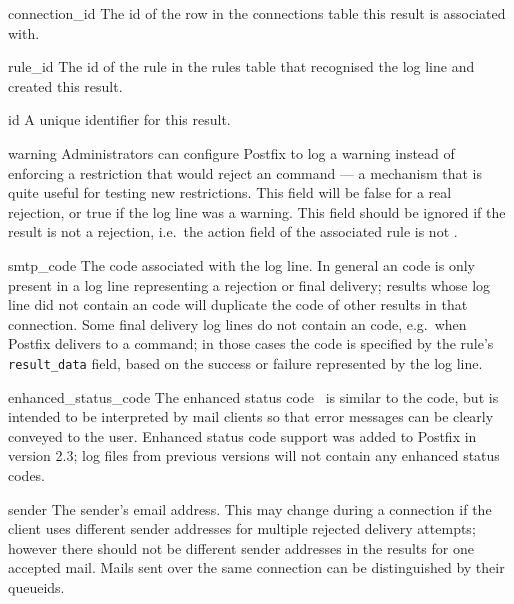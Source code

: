 \begin{boldeqlist}

    \item [connection\_id] The id of the row in the connections table this
        result is associated with.

    \item [rule\_id] The id of the rule in the rules table that recognised
        the log line and created this result.

    \item [id] A unique identifier for this result.

    \item [warning] Administrators can configure Postfix to log a warning
        instead of enforcing a restriction that would reject an
         command --- a mechanism that is quite useful for
        testing new restrictions.  This field will be false for a real
        rejection, or true if the log line was a warning.  This field
        should be ignored if the result is not a rejection, i.e.\ the
        action field of the associated rule is not
        .

    \item [smtp\_code] The  code associated with the log
        line.  In general an  code is only present in a log
        line representing a rejection or final delivery; results whose log
        line did not contain an  code will duplicate the
         code of other results in that connection.  Some
        final delivery log lines do not contain an  code,
        e.g.\ when Postfix delivers to a command; in those cases the
         code is specified by the rule's
        \texttt{result\_data} field, based on the success or failure
        represented by the log line.

    \item [enhanced\_status\_code] The enhanced status code~\cite{RFC3463}
        is similar to the  code, but is intended to be
        interpreted by mail clients so that error messages can be clearly
        conveyed to the user.  Enhanced status code support was added to
        Postfix in version 2.3; log files from previous versions will not
        contain any enhanced status codes.

    \item [sender] The sender's email address.  This may change during a
        connection if the client uses different sender addresses for
        multiple rejected delivery attempts; however there should not be
        different sender addresses in the results for one accepted mail.
        Mails sent over the same connection can be distinguished by their
        queueids.


\end{boldeqlist}
